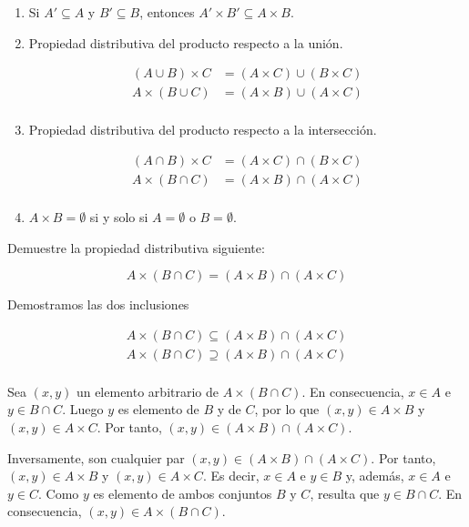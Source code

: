 \begin{enumerate}
  \item Si $A' \subseteq A$ y $B' \subseteq B$, entonces $A' \times B'
    \subseteq A \times B$.

  \item Propiedad distributiva del producto respecto a la unión.

  \begin{align*}
    (A \cup B) \times C &= (A \times C) \cup (B \times C) \\
    A \times (B \cup C) &= (A \times B) \cup (A \times C) \\
  \end{align*}

\item Propiedad distributiva del producto respecto a la intersección.

  \begin{align*}
    (A \cap B) \times C &= (A \times C) \cap (B \times C) \\
    A \times (B \cap C) &= (A \times B) \cap (A \times C) \\
  \end{align*}

  \item $A \times B = \emptyset$ si y solo si $A = \emptyset$ o $B =
    \emptyset$.
\end{enumerate}

\begin{exercise}
  Demuestre la propiedad distributiva siguiente:

  \[ A \times (B \cap C) = (A \times B) \cap (A \times C) \]

  Demostramos las dos inclusiones

  \begin{align*}
    A \times (B \cap C) \subseteq (A \times B) \cap (A \times C) \\
    A \times (B \cap C) \supseteq (A \times B) \cap (A \times C) \\
  \end{align*}

  Sea $(x, y)$ un elemento arbitrario de $A \times (B \cap C)$. En
  consecuencia, $x \in A$ e $y \in B \cap C$. Luego $y$ es elemento de $B$ y
  de $C$, por lo que $(x, y) \in A \times B$ y $(x, y) \in A \times C$. Por
  tanto, $(x, y) \in (A \times B) \cap (A \times C)$.

  Inversamente, son cualquier par $(x, y) \in (A \times B) \cap (A \times
  C)$. Por tanto, $(x, y) \in A \times B$ y $(x, y) \in A \times C$. Es
  decir, $x \in A$ e $y \in B$ y, además, $x \in A$ e $y \in C$. Como $y$ es
  elemento de ambos conjuntos $B$ y $C$, resulta que $y \in B \cap C$. En
  consecuencia, $(x, y) \in A \times (B \cap C)$.
\end{exercise}

